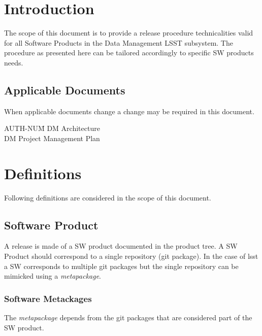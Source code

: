 \section{Introduction} \label{sec:intro}

The scope of this document is to provide a release procedure technicalities valid for all Software Products in the Data Management LSST subsystem. The procedure as presented here can be tailored accordingly to specific SW products needs.

\subsection{Applicable Documents}

When applicable documents change a change may be required in this document.
\begin{tabbing}
AUTH-NUM\= \kill
{} \>     DM Architecture\\
 \>     DM Project Management Plan   \\
\end{tabbing}


\newpage
\section{Definitions} \label{sec:definitions}

Following definitions are considered in the scope of this document.

\subsection{Software Product} \label{sect:swprod}
A release is made of a SW product documented in the product tree.
A SW Product should correspond to a single repository (git package).
In the case of lsst a SW corresponds to multiple git packages but the single repository can be mimicked using a \textit{metapackage}.

\subsubsection{Software Metackages} \label{sect:metapkgs}
The \textit{metapackage} depends from the git packages that are considered part of the SW product. 

